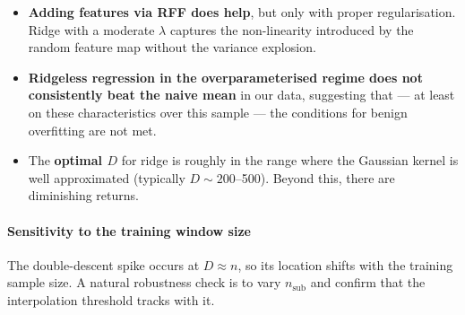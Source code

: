 \begin{itemize}
\item \textbf{Adding features via RFF does help}, but only with proper regularisation. Ridge with a moderate $\lambda$ captures the non-linearity introduced by the random feature map without the variance explosion.
\item \textbf{Ridgeless regression in the overparameterised regime does not consistently beat the naive mean} in our data, suggesting that --- at least on these characteristics over this sample --- the conditions for benign overfitting are not met.
\item The \textbf{optimal $D$} for ridge is roughly in the range where the Gaussian kernel is well approximated (typically $D \sim 200$--500). Beyond this, there are diminishing returns.
\end{itemize}

\paragraph{Sensitivity to the training window size}

The double-descent spike occurs at $D \approx n$, so its location shifts with the training sample size. A natural robustness check is to vary $n_{\text{sub}}$ and confirm that the interpolation threshold tracks with it.

